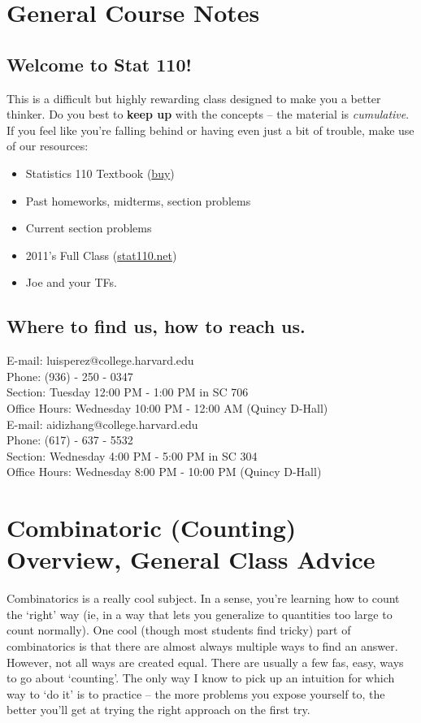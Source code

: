 \documentclass[11pt]{article}
\begin{document}

\section*{General Course Notes}
\subsection*{Welcome to Stat 110!}
This is a difficult but highly rewarding class designed to make you a better thinker. Do you best to \textbf{keep up} with the concepts -- the material is \textit{cumulative}. If you feel like you're falling behind or having even just a bit of trouble, make use of our resources:
\begin{itemize}
\item Statistics 110 Textbook (\href{http://www.amazon.com/gp/product/1466575573/ref=as_li_tl?ie=UTF8&camp=1789&creative=390957&creativeASIN=1466575573&linkCode=as2}{buy})
\item Past homeworks, midterms, section problems
\item Current section problems
\item 2011's Full Class (\href{http://projects.iq.harvard.edu/stat110/about}{stat110.net})
\item Joe and your TFs.
\end{itemize}
\subsection*{Where to find us, how to reach us.}
E-mail: luisperez@college.harvard.edu \\
Phone: (936) - 250 - 0347 \\
Section: Tuesday 12:00 PM - 1:00 PM in SC 706 \\
Office Hours: Wednesday 10:00 PM - 12:00 AM (Quincy D-Hall) \\

E-mail: aidizhang@college.harvard.edu \\
Phone: (617) - 637 - 5532 \\
Section: Wednesday 4:00 PM - 5:00 PM in SC 304\\
Office Hours: Wednesday 8:00 PM - 10:00 PM (Quincy D-Hall) \\

\section*{Combinatoric (Counting) Overview, General Class Advice}
Combinatorics is a really cool subject. In a sense, you're learning how to count the `right' way (ie, in a way that lets you generalize to quantities too large to count normally). One cool (though most students find tricky) part of combinatorics is that there are almost always multiple ways to find an answer. However, not all ways are created equal. There are usually a few fas, easy, ways to go about `counting'. The only way I know to pick up an intuition for which way to `do it' is to practice -- the more problems you expose yourself to, the better you'll get at trying the right approach on the first try. \\
\end{document}
